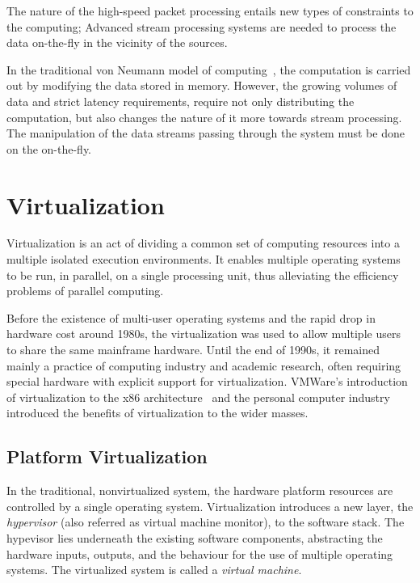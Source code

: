 The nature of the high-speed packet processing entails new types of constraints to the computing; Advanced stream processing systems are needed to process the data on-the-fly in the vicinity of the sources.~\cite{Bonomi:2012:Fog}

In the traditional von Neumann model of computing~\cite{Neumann:1993:EDVAC}, the computation is carried out by modifying the data stored in memory. However, the growing volumes of data and strict latency requirements, require not only distributing the computation, but also changes the nature of it more towards stream processing. The manipulation of the data streams passing through the system must be done on the on-the-fly.~\cite{Bonomi:2012:Fog, Thies:2002:StreamIt}

\section{Virtualization}
\label{section:virtualization}
Virtualization is an act of dividing a common set of computing resources into a multiple isolated execution environments. It enables multiple operating systems to be run, in parallel, on a single processing unit, thus alleviating the efficiency problems of parallel computing.

Before the existence of multi-user operating systems and the rapid drop in hardware cost around 1980s, the virtualization was used to allow multiple users to share the same mainframe hardware. Until the end of 1990s, it remained mainly a practice of computing industry and academic research, often requiring special hardware with explicit support for virtualization. VMWare's introduction of virtualization to the x86 architecture~\cite{Walters:1999:VVP} and the personal computer industry introduced the benefits of virtualization to the wider masses.~\cite{Bugnion:2012:BVX, Barham:2003:XAV}

\subsection{Platform Virtualization}
In the traditional, nonvirtualized system, the hardware platform resources are controlled by a single operating system. Virtualization introduces a new layer, the \emph{hypervisor} (also referred as virtual machine monitor), to the software stack. The hypevisor lies underneath the existing software components, abstracting the hardware inputs, outputs, and the behaviour for the use of multiple operating systems. The virtualized system is called a \emph{virtual machine}.~\cite{Uhlig:2005:IVT, Bugnion:2012:BVX, Barham:2003:XAV}

